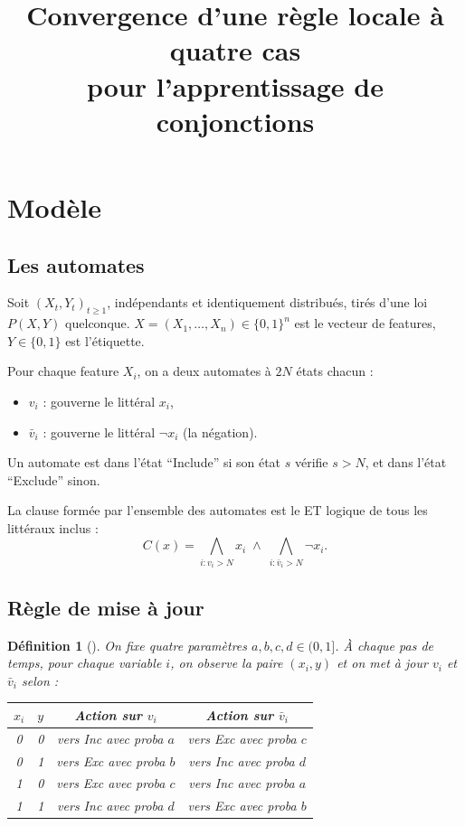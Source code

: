 \documentclass[11pt]{article}
\title{Convergence d'une règle locale à quatre cas\\pour l'apprentissage de conjonctions\\[4pt]}
\author{}
\date{}
\newtheorem{definition}{Définition}
\begin{document}
\maketitle


\section{Modèle}

\subsection{Les automates}

Soit $(X_t, Y_t)_{t \ge 1}$, indépendants et identiquement distribués, tirés d'une loi $P(X,Y)$ quelconque. $X = (X_1, \dots, X_n) \in \{0,1\}^n$ est le vecteur de features, $Y \in \{0,1\}$ est l'étiquette.

Pour chaque feature $X_i$, on a deux automates à $2N$ états chacun :
\begin{itemize}
\item $v_i$ : gouverne le littéral $x_i$,
\item $\bar v_i$ : gouverne le littéral $\neg x_i$ (la négation).
\end{itemize}

Un automate est dans l'état ``Include'' si son état $s$ vérifie $s > N$, et dans l'état ``Exclude'' sinon.

La clause formée par l'ensemble des automates est le ET logique de tous les littéraux inclus :
$$C(x) = \bigwedge_{i : v_i > N} x_i \; \wedge \; \bigwedge_{i : \bar v_i > N} \neg x_i.$$



\subsection{Règle de mise à jour}

\begin{definition}[]
On fixe quatre paramètres $a, b, c, d \in (0,1]$. À chaque pas de temps, pour chaque variable $i$, on observe la paire $(x_i, y)$ et on met à jour $v_i$ et $\bar v_i$ selon :

\begin{center}
\begin{tabular}{cc|cc}
\toprule
$x_i$ & $y$ & Action sur $v_i$ & Action sur $\bar v_i$ \\
\midrule
0 & 0 & vers Inc avec proba $a$ & vers Exc avec proba $c$ \\
0 & 1 & vers Exc avec proba $b$ & vers Inc avec proba $d$ \\
1 & 0 & vers Exc avec proba $c$ & vers Inc avec proba $a$ \\
1 & 1 & vers Inc avec proba $d$ & vers Exc avec proba $b$ \\
\bottomrule
\end{tabular}
\end{center}
\end{definition}
\end{document}
